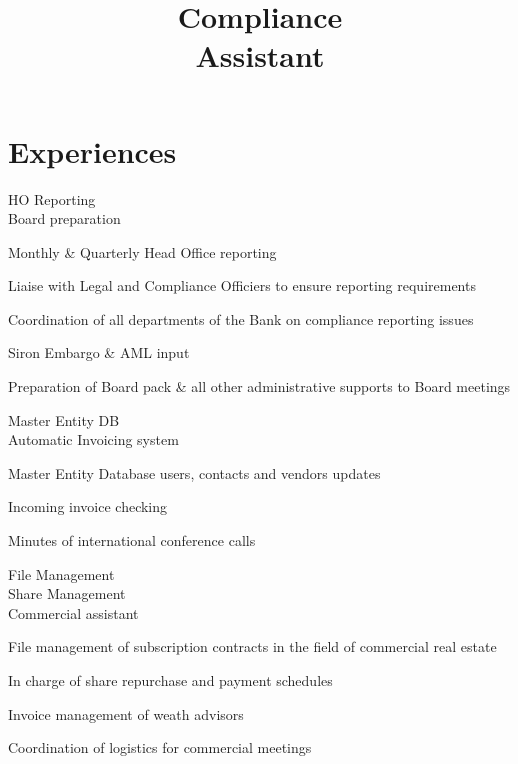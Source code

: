 \documentclass[a4paper,11pt]{cv4tw}%
\title{Compliance\\Assistant}
\begin{document}



	\section{Experiences}

	{HO Reporting\\Board preparation}
		{
		\begin{missions}
			\item Monthly \& Quarterly Head Office reporting
			\item Liaise with Legal and Compliance Officiers to ensure reporting requirements
			\item Coordination of all departments of the Bank on compliance reporting issues
			\item Siron Embargo \& AML input
			\item Preparation of Board pack \& all other administrative supports to Board meetings
		\end{missions}
	}


	{Master Entity DB\\Automatic Invoicing system}
		{
		\begin{missions}
			\item Master Entity Database users, contacts and vendors updates
			\item Incoming invoice checking
			\item Minutes of international conference calls
		\end{missions}
	}

	{File Management\\Share Management\\Commercial assistant}
		{ 
		\begin{missions}
			\item File management of subscription contracts in the field of commercial real estate
			\item In charge of share repurchase and payment schedules
			\item Invoice management of weath advisors
			\item Coordination of logistics for commercial meetings
		\end{missions}
	}
\end{document}
